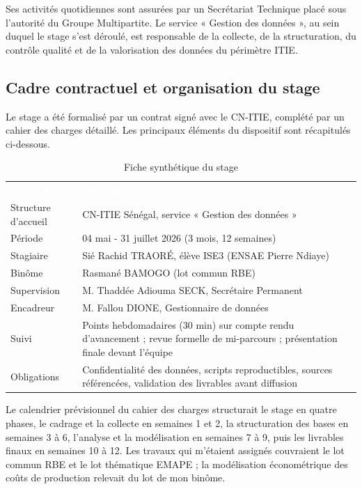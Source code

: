\documentclass[12pt, a4paper]{article}
\newcommand{\entete}{\rowcolor{ensaeorange}}
\newcommand{\zebre}{\rowcolors{2}{white}{ensaerow}}
\newcommand{\nozebre}{\rowcolors{1}{}{}}
\begin{document}
Ses activités quotidiennes sont assurées par un Secrétariat Technique placé
sous l'autorité du Groupe Multipartite. Le service « Gestion des
données », au sein duquel le stage s'est déroulé, est responsable de la
collecte, de la structuration, du contrôle qualité et de la valorisation des
données du périmètre ITIE.

\subsection{Cadre contractuel et organisation du stage}

Le stage a été formalisé par un contrat signé avec le CN-ITIE, complété par un
cahier des charges détaillé. Les principaux éléments du dispositif sont
récapitulés ci-dessous.

\begin{table}[H]
\centering
\caption{Fiche synthétique du stage}
\zebre
\begin{tabular}{p{4.5cm}p{9.5cm}}
  \entete
  \textcolor{white}{\textbf{Élément}} & \textcolor{white}{\textbf{Description}}\\
  Structure d'accueil & CN-ITIE Sénégal, service « Gestion des données »\\
  Période & 04 mai - 31 juillet 2026 (3 mois, 12 semaines)\\
  Stagiaire & Sié Rachid TRAORÉ, élève ISE3 (ENSAE Pierre Ndiaye)\\
  Binôme & Rasmané BAMOGO (lot commun RBE)\\
  Supervision & M. Thaddée Adiouma SECK, Secrétaire Permanent\\
  Encadreur & M. Fallou DIONE, Gestionnaire de données\\
  Suivi & Points hebdomadaires (30 min) sur compte rendu d'avancement ; revue formelle de mi-parcours ; présentation finale devant l'équipe\\
  Obligations & Confidentialité des données, scripts reproductibles, sources référencées, validation des livrables avant diffusion\\
\end{tabular}
\nozebre
\end{table}

Le calendrier prévisionnel du cahier des charges structurait le stage en quatre
phases, le cadrage et la collecte en semaines 1 et 2, la structuration des
bases en semaines 3 à 6, l'analyse et la modélisation en semaines 7 à 9, puis
les livrables finaux en semaines 10 à 12. Les travaux qui
m'étaient assignés couvraient le lot commun RBE et le lot thématique EMAPE ;
la modélisation économétrique des coûts de production relevait du lot de mon
binôme.
\end{document}
